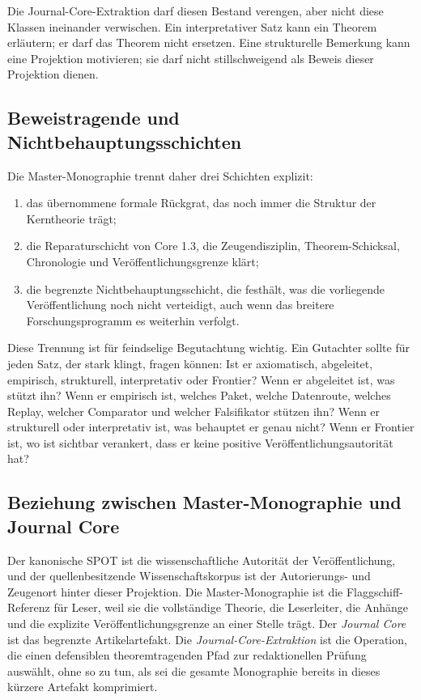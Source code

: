 Die Journal-Core-Extraktion darf diesen Bestand verengen, aber nicht diese
Klassen ineinander verwischen.
Ein interpretativer Satz kann ein Theorem erläutern; er darf das Theorem nicht
ersetzen.
Eine strukturelle Bemerkung kann eine Projektion motivieren; sie darf nicht
stillschweigend als Beweis dieser Projektion dienen.

\subsection{Beweistragende und Nichtbehauptungsschichten}

Die Master-Monographie trennt daher drei Schichten explizit:

\begin{enumerate}
\item das übernommene formale Rückgrat, das noch immer die Struktur der
      Kerntheorie trägt;
\item die Reparaturschicht von Core 1.3, die Zeugendisziplin, Theorem-Schicksal,
      Chronologie und Veröffentlichungsgrenze klärt;
\item die begrenzte Nichtbehauptungsschicht, die festhält, was die vorliegende
      Veröffentlichung noch nicht verteidigt, auch wenn das breitere
      Forschungsprogramm es weiterhin verfolgt.
\end{enumerate}

Diese Trennung ist für feindselige Begutachtung wichtig.
Ein Gutachter sollte für jeden Satz, der stark klingt, fragen können:
Ist er axiomatisch, abgeleitet, empirisch, strukturell, interpretativ oder
Frontier?
Wenn er abgeleitet ist, was stützt ihn?
Wenn er empirisch ist, welches Paket, welche Datenroute, welches Replay,
welcher Comparator und welcher Falsifikator stützen ihn?
Wenn er strukturell oder interpretativ ist, was behauptet er genau nicht?
Wenn er Frontier ist, wo ist sichtbar verankert, dass er keine positive
Veröffentlichungsautorität hat?

\subsection{Beziehung zwischen Master-Monographie und Journal Core}

Der kanonische SPOT ist die wissenschaftliche Autorität der Veröffentlichung,
und der quellenbesitzende Wissenschaftskorpus ist der Autorierungs- und
Zeugenort hinter dieser Projektion. Die Master-Monographie ist die
Flaggschiff-Referenz für Leser, weil sie die vollständige Theorie, die
Leserleiter, die Anhänge und die explizite Veröffentlichungsgrenze an einer
Stelle trägt.
Der \emph{Journal Core} ist das begrenzte Artikelartefakt. Die
\emph{Journal-Core-Extraktion} ist die Operation, die einen defensiblen
theoremtragenden Pfad zur redaktionellen Prüfung auswählt, ohne so zu tun, als
sei die gesamte Monographie bereits in dieses kürzere Artefakt komprimiert.

